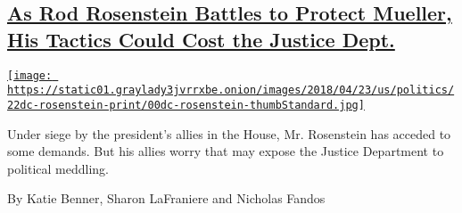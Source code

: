\begin{enumerate}
\begin{enumerate}
    \hypertarget{as-rod-rosenstein-battles-to-protect-mueller-his-tactics-could-cost-the-justice-dept}{%
    \subsection{\texorpdfstring{\href{/2018/04/21/us/politics/rod-rosenstein-justice-department.html}{As
    Rod Rosenstein Battles to Protect Mueller, His Tactics Could Cost
    the Justice
    Dept.}}{As Rod Rosenstein Battles to Protect Mueller, His Tactics Could Cost the Justice Dept.}}\label{as-rod-rosenstein-battles-to-protect-mueller-his-tactics-could-cost-the-justice-dept}}

    \href{/2018/04/21/us/politics/rod-rosenstein-justice-department.html}{\texttt{[image: https://static01.graylady3jvrrxbe.onion/images/2018/04/23/us/politics/22dc-rosenstein-print/00dc-rosenstein-thumbStandard.jpg]}}

    Under siege by the president's allies in the House, Mr. Rosenstein
    has acceded to some demands. But his allies worry that may expose
    the Justice Department to political meddling.

    By Katie Benner, Sharon LaFraniere and Nicholas Fandos
  \end{enumerate}
\end{enumerate}

